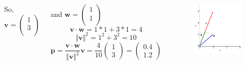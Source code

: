 \documentclass{beamer}
\begin{document}
\begin{frame}
\begin{columns}[c]

So, 
	$\mathbf{v} = \left(
		\begin{array}{c}
		1\\
		3\\
		\end{array}
	\right)$

and 
	$\mathbf{w} = \left(
		\begin{array}{c}
		1\\
		1\\
		\end{array}
	\right)$\\
	

$$\mathbf{v} \cdot  \mathbf{w} = 1*1 + 3 *1 = 4 $$
$$\Vert \mathbf{v} \Vert^2 = 1^2 + 3^2 = 10 $$
$$  \mathbf{p} =\frac{\mathbf{v} \cdot  \mathbf{w}} {\Vert \mathbf{v} \Vert^2} \mathbf{v} =   \frac{4}{10} \left(
		\begin{array}{c}
		1\\
		3
		\end{array}
		\right)		
		= \left(
		\begin{array}{c}
		0.4\\
		1.2
		\end{array}
		\right)$$

\begin{figure}[htbp]
\begin{center}
 \includegraphics[width=\textwidth]{figure4b.png}
\caption{}
\end{center}
\end{figure}
\end{columns}
\end{frame}
\end{document}
